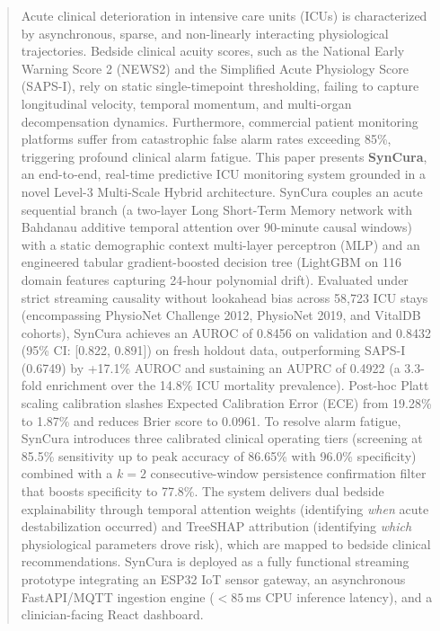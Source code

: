 \documentclass[conference]{IEEEtran}
\begin{document}
\begin{abstract}
Acute clinical deterioration in intensive care units (ICUs) is characterized by asynchronous, sparse, and non-linearly interacting physiological trajectories. Bedside clinical acuity scores, such as the National Early Warning Score 2 (NEWS2) and the Simplified Acute Physiology Score (SAPS-I), rely on static single-timepoint thresholding, failing to capture longitudinal velocity, temporal momentum, and multi-organ decompensation dynamics. Furthermore, commercial patient monitoring platforms suffer from catastrophic false alarm rates exceeding 85\%, triggering profound clinical alarm fatigue. This paper presents \textbf{SynCura}, an end-to-end, real-time predictive ICU monitoring system grounded in a novel Level-3 Multi-Scale Hybrid architecture. SynCura couples an acute sequential branch (a two-layer Long Short-Term Memory network with Bahdanau additive temporal attention over 90-minute causal windows) with a static demographic context multi-layer perceptron (MLP) and an engineered tabular gradient-boosted decision tree (LightGBM on 116 domain features capturing 24-hour polynomial drift). Evaluated under strict streaming causality without lookahead bias across 58,723 ICU stays (encompassing PhysioNet Challenge 2012, PhysioNet 2019, and VitalDB cohorts), SynCura achieves an AUROC of 0.8456 on validation and 0.8432 (95\% CI: [0.822, 0.891]) on fresh holdout data, outperforming SAPS-I (0.6749) by +17.1\% AUROC and sustaining an AUPRC of 0.4922 (a 3.3-fold enrichment over the 14.8\% ICU mortality prevalence). Post-hoc Platt scaling calibration slashes Expected Calibration Error (ECE) from 19.28\% to 1.87\% and reduces Brier score to 0.0961. To resolve alarm fatigue, SynCura introduces three calibrated clinical operating tiers (screening at 85.5\% sensitivity up to peak accuracy of 86.65\% with 96.0\% specificity) combined with a $k=2$ consecutive-window persistence confirmation filter that boosts specificity to 77.8\%. The system delivers dual bedside explainability through temporal attention weights (identifying \textit{when} acute destabilization occurred) and TreeSHAP attribution (identifying \textit{which} physiological parameters drove risk), which are mapped to bedside clinical recommendations. SynCura is deployed as a fully functional streaming prototype integrating an ESP32 IoT sensor gateway, an asynchronous FastAPI/MQTT ingestion engine ($<85$\,ms CPU inference latency), and a clinician-facing React dashboard.
\end{abstract}
\end{document}
